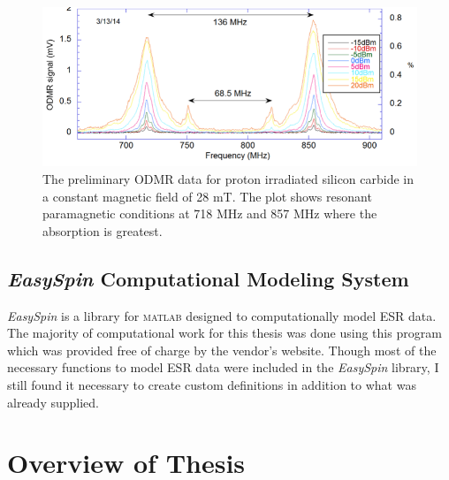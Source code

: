 \documentclass[oneside, noacknowlegments]{BYUPhys}
\begin{document}
\begin{figure}
    \centerline{\includegraphics{prelim_odmr_fig}}
    \caption[Preliminary ODMR Data]{\label{fig:PrelimODMR}
     The preliminary ODMR data for proton irradiated silicon carbide in a constant magnetic field of 28 mT. The plot shows resonant paramagnetic conditions at 718 MHz and 857 MHz where the absorption is greatest. }
\end{figure}

\subsection{\textit{EasySpin} Computational Modeling System}

\textit{EasySpin} \cite{RefWorks:doc:589299fbe4b0dec22aee3bd8} is a library for \textsc{matlab} designed to computationally model ESR data. The majority of computational work for this thesis was done using this program which was provided free of charge by the vendor's website. Though most of the necessary functions to model ESR data were included in the \textit{EasySpin} library, I still found it necessary to create custom definitions in addition to what was already supplied.

\section{Overview of Thesis}
\end{document}
